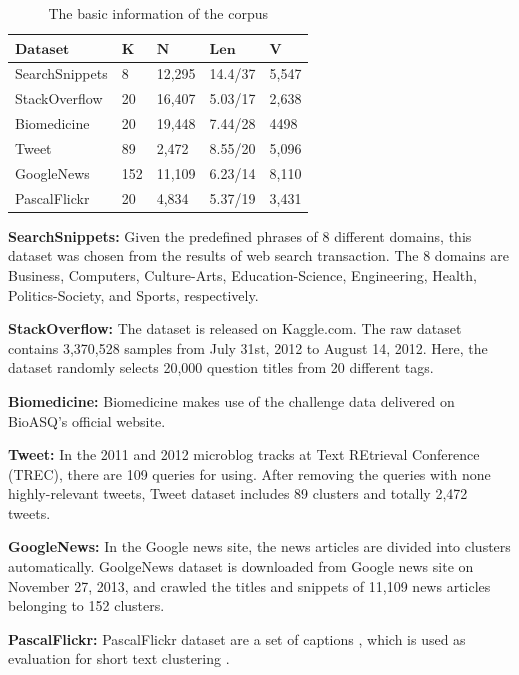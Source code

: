 \documentclass[10pt,journal,compsoc]{IEEEtran}
\begin{document}
{\begin{table}[H]
  \centering
  \caption{The basic information of the corpus} \label{corpus}
  \begin{tabular}{|l|l|l|l|l|}
    \hline
    $\bm{Dataset}$&{$\bm{K}$}&{$\bm{N}$}&{$\bm{Len}$}&{$\bm{V}$}\\
    \hline
    {SearchSnippets}&{8}&{12,295}&{14.4/37}&{5,547}\\
    \hline
    {StackOverflow}&{20}&{16,407}&{5.03/17}&{2,638}\\
    \hline
    {Biomedicine}&{20}&{19,448}&{7.44/28}&{4498}\\
    \hline
    {Tweet}&{89}&{2,472}&{8.55/20}&{5,096}\\
    \hline
    {GoogleNews}&{152}&{11,109}&{6.23/14}&{8,110}\\
    \hline
    {PascalFlickr}&{20}&{4,834}&{5.37/19}&{3,431}\\
    \hline
    \end{tabular}
\end{table}

 \textbf{SearchSnippets:} Given the predefined phrases of 8 different domains, this dataset was chosen from the results of web search transaction. The 8 domains are Business, Computers, Culture-Arts, Education-Science, Engineering, Health, Politics-Society, and Sports, respectively.

 \textbf{StackOverflow:} The dataset is released on Kaggle.com. The raw dataset contains 3,370,528 samples from July 31st, 2012 to August 14, 2012. Here, the dataset randomly selects 20,000 question titles from 20 different tags.


 \textbf{Biomedicine:} Biomedicine makes use of the challenge data delivered on BioASQ's official website.

 \textbf{Tweet:} In the 2011 and 2012 microblog tracks at Text REtrieval Conference (TREC), there are 109 queries for using. After removing the queries with none highly-relevant tweets, Tweet dataset includes 89 clusters and totally 2,472 tweets.

 \textbf{GoogleNews:} In the Google news site, the news articles are divided into clusters automatically. GoolgeNews dataset is downloaded from Google news site on November 27, 2013, and crawled the titles and snippets of 11,109 news articles belonging to 152 clusters.

 \textbf{PascalFlickr:} PascalFlickr dataset are a set of captions \cite{rashtchian2010collecting}, which is used as evaluation for short text clustering \cite{finegan2016effects}.


}
\end{document}
